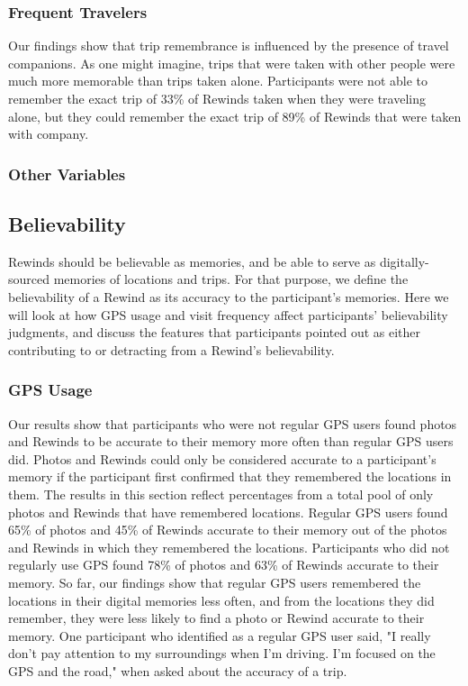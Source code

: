 \documentclass{sigchi}
\begin{document}
\subsubsection{Frequent Travelers}
Our findings show that trip remembrance is influenced by the presence of travel companions. As one might imagine, trips that were taken with other people were much more memorable than trips taken alone. Participants were not able to remember the exact trip of 33\% of Rewinds taken when they were traveling alone, but they could remember the exact trip of 89\% of Rewinds that were taken with company.

\subsubsection{Other Variables}

\subsection{Believability}
Rewinds should be believable as memories, and be able to serve as digitally-sourced memories of locations and trips. For that purpose, we define the believability of a Rewind as its accuracy to the participant's memories. Here we will look at how GPS usage and visit frequency affect participants' believability judgments, and discuss the features that participants pointed out as either contributing to or detracting from a Rewind's believability.

\subsubsection{GPS Usage}
Our results show that participants who were not regular GPS users found photos and Rewinds to be accurate to their memory more often than regular GPS users did. Photos and Rewinds could only be considered accurate to a participant's memory if the participant first confirmed that they remembered the locations in them. The results in this section reflect percentages from a total pool of only photos and Rewinds that have remembered locations. Regular GPS users found 65\% of photos and 45\% of Rewinds accurate to their memory out of the photos and Rewinds in which they remembered the locations. Participants who did not regularly use GPS found 78\% of photos and 63\% of Rewinds accurate to their memory. So far, our findings show that regular GPS users remembered the locations in their digital memories less often, and from the locations they did remember, they were less likely to find a photo or Rewind accurate to their memory. One participant who identified as a regular GPS user said, "I really don't pay attention to my surroundings when I'm driving. I'm focused on the GPS and the road," when asked about the accuracy of a trip.
\end{document}
